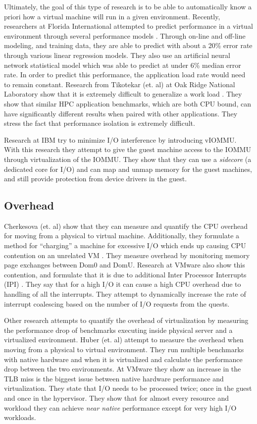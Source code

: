 Ultimately, the goal of this type of research is to be able to automatically know a priori how a virtual machine will run in a given environment.  Recently, researchers at Florida International attempted to predict performance in a virtual environment through several performance models \cite{kundu}.  Through on-line and off-line modeling, and training data, they are able to predict with about a 20\% error rate through various linear regression models.  They also use an artificial neural network statistical model which was able to predict at under 6\% median error rate.   In order to predict this performance, the application load rate would need to remain constant.  Research from Tikotekar (et. al) at Oak Ridge National Laboratory show that it is extremely difficult to generalize a work load \cite{tikotekar}.  They show that similar HPC application benchmarks, which are both CPU bound, can have significantly different results when paired with other applications.  They stress the fact that performance isolation is extremely difficult.

Research at IBM \cite{amit} try to minimize I/O interference by introducing vIOMMU.  With this research they attempt to give the guest machine access to the IOMMU through virtualization of the IOMMU.  They show that they can use a \emph{sidecore} (a dedicated core for I/O) and can map and unmap memory for the guest machines, and still provide protection from device drivers in the guest. 

\subsection{Overhead}
Cherkesova (et. al) show that they can measure and quantify the CPU overhead for moving from a physical to virtual machine.  Additionally, they formulate a method for “charging” a machine for excessive I/O which ends up causing CPU contention on an unrelated VM \cite{cherkasova}.  They measure overhead by monitoring memory page exchanges between Dom0 and DomU.  Research at VMware also show this contention, and formulate that it is due to additional Inter Processor Interrupts (IPI) \cite{ahmad}.   They say that for a high I/O it can cause a high CPU overhead due to handling of all the interrupts.  They attempt to dynamically increase the rate of interrupt coalescing based on the number of I/O requests from the quests.

Other research attempts to quantify the overhead of virtualization by measuring the performance drop of benchmarks executing inside physical server and a virtualized environment.  Huber (et. al) \cite{huber1} attempt to measure the overhead when moving from a physical to virtual environment.  They run multiple benchmarks with native hardware and when it is virtualized and calculate the performance drop between the two environments. At VMware \cite{buell1} they show an increase in the TLB miss is the biggest issue between native hardware performance and virtualization.  They state that I/O needs to be processed twice; once in the guest and once in the hypervisor.  They show that for almost every resource and workload they can achieve \emph{near native} performance except for very high I/O workloads.

